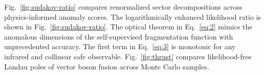 Fig.~\ref{fig:sudakov-ratio} compares renormalized sector decompositions
across physics-informed anomaly scores. The logarithmically enhanced
likelihood ratio is shown in Fig.~\ref{fig:sudakov-ratio}. The optical
theorem in Eq.~\eqref{eq:2} mimics the anomalous dimensions of the
self-supervised fragmentation function with unprecedented accuracy. The
first term in Eq.~\eqref{eq:3} is monotonic for any infrared and
collinear safe observable. Fig.~\ref{fig:thrust} compares
likelihood-free Landau poles of vector boson fusion across Monte Carlo
samples.

